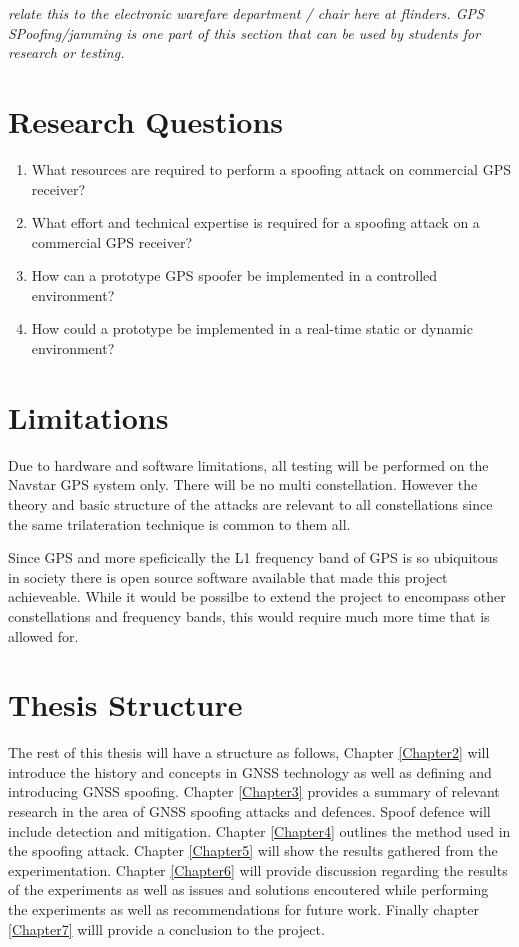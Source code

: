 \emph{relate this to the electronic warefare department / chair here at flinders. GPS SPoofing/jamming is one part of this section that can be used by students for research or testing.}

\section{Research Questions}\label{sec:RQs}
\begin{enumerate}
    \item What resources are required to perform a spoofing attack on commercial GPS receiver?
    \item What effort and technical expertise is required for a spoofing attack on a commercial GPS receiver?
    \item How can a prototype GPS spoofer be implemented in a controlled environment?
    \item How could a prototype be implemented in a real-time static or dynamic environment? 
\end{enumerate}

\section{Limitations}\label{sec:Limits}
Due to hardware and software limitations, all testing will be performed on the Navstar GPS system only. There will be no multi constellation. However the theory and basic
structure of the attacks are relevant to all constellations since the same trilateration technique is common to them all.

Since GPS and more speficically the L1 frequency band of GPS is so ubiquitous in society there is open source software available that made this project achieveable. While
it would be possilbe to extend the project to encompass other constellations and frequency bands, this would require much more time that is allowed for.

\section{Thesis Structure}\label{sec:structure}
The rest of this thesis will have a structure as follows, Chapter \ref{Chapter2} will introduce the history and concepts in GNSS technology as well as defining and
introducing GNSS spoofing. Chapter \ref{Chapter3} provides a summary of relevant research in the area of GNSS spoofing attacks and defences. Spoof defence will include
detection and mitigation. Chapter \ref{Chapter4} outlines the method used in the spoofing attack. Chapter \ref{Chapter5} will show the results gathered from the
experimentation. Chapter \ref{Chapter6} will provide discussion regarding the results of the experiments as well as issues and solutions encoutered while performing the
experiments as well as recommendations for future work. Finally chapter \ref{Chapter7} willl provide a conclusion to the project.